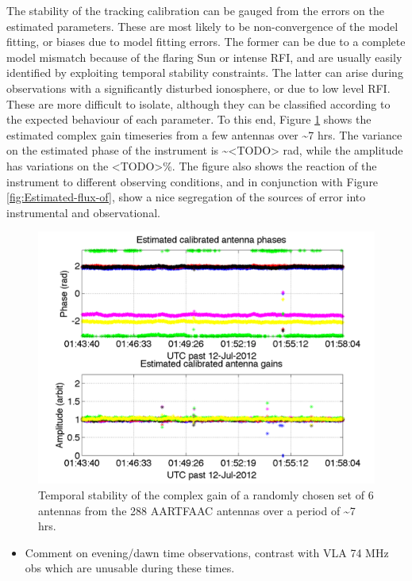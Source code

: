 \documentclass{aa}
\begin{document}
The stability of  the tracking calibration can be gauged from  the errors on the
estimated parameters. These  are most likely to be  non-convergence of the model
fitting, or  biases due  to model  fitting errors. The  former can  be due  to a
complete  model mismatch  because of  the flaring  Sun or  intense RFI,  and are
usually  easily identified  by  exploiting temporal  stability constraints.  The
latter can arise during  observations with a significantly disturbed ionosphere,
or due to low level RFI. These  are more difficult to isolate, although they can
be classified  according to  the expected behaviour  of each parameter.  To this
end, Figure  \ref{fig:gain-Temporal-stability} shows the  estimated complex gain
timeseries from a few antennas  over \textasciitilde{}7 hrs. The variance on the
estimated  phase of  the instrument  is \textasciitilde{}<TODO>  rad,  while the
amplitude has variations on the <TODO>\%.  The figure also shows the reaction of
the instrument to different observing conditions, and in conjunction with Figure
\ref{fig:Estimated-flux-of},  show a nice  segregation of  the sources  of error
into instrumental and observational.

\begin{figure}[tbh]
\includegraphics[width=1\textwidth]{Figs/SB002_LBA_OUTER_SPREAD_1ch_8_convcalsol_bin_gains.png}\caption{\label{fig:gain-Temporal-stability}Temporal stability of the complex
gain of a randomly chosen set of 6 antennas from the 288 AARTFAAC
antennas over a period of \textasciitilde{}7 hrs.}
\end{figure}

\begin{itemize}
\item Comment on evening/dawn time observations, contrast with VLA 74 MHz
obs which are unusable during these times.
\end{itemize}
\end{document}
